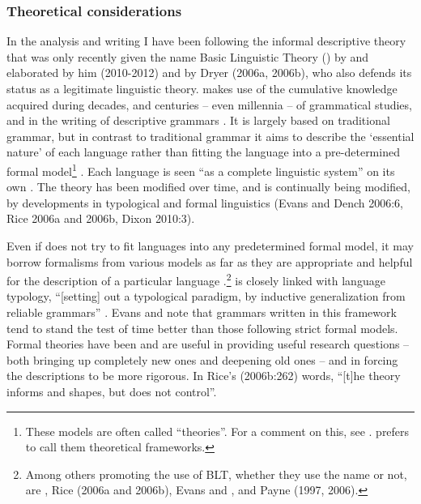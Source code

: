 \subsubsection{Theoretical considerations}
\hypertarget{RefHeading18361935131865}{}In the analysis and writing I have been following the informal descriptive theory that was only recently given the name Basic Linguistic Theory () by \citet{Dixon1997} and elaborated by him (2010-2012) and by Dryer (2006a, 2006b), who also defends its status as a legitimate linguistic theory.  makes use of the cumulative knowledge acquired during decades, and centuries -- even millennia -- of grammatical studies, and in the writing of descriptive grammars \citep[3]{Dixon2010}. It is largely based on traditional grammar, but in contrast to traditional grammar it aims to describe the `essential nature' of each language rather than fitting the language into a pre-determined formal model\footnote{These models are often called ``theories''.  For a comment on this, see \citet[131]{Dixon1997}. \citet{Dryer2006a} prefers to call them theoretical frameworks.} \citep[211]{Dryer2006a}. Each language is seen ``as a complete linguistic system'' on its own \citep[4]{Dixon2010}. The theory has been modified over time, and is continually being modified, by developments in typological and formal linguistics (Evans and Dench 2006:6, Rice 2006a and 2006b, Dixon 2010:3).  

Even if  does not try to fit languages into any predetermined formal model, it may borrow formalisms from various models as far as they are appropriate and helpful for the description of a particular language \citep[128-135]{Dixon1997}.\footnote{Among others promoting the use of BLT, whether they use the name or not, are \citet[354]{Noonan2006}, Rice (2006a and 2006b), Evans and \citet{Dench2006}, and Payne (1997, 2006).}   is closely linked with language typology, ``[setting] out a typological paradigm, by inductive generalization from reliable grammars'' \citep[205]{Dixon2010}. Evans and \citet[6]{Dench2006} note that grammars written in this framework tend to stand the test of time better than those following strict formal models. Formal theories have been and are useful in providing useful research questions -- both bringing up completely new ones and deepening old ones -- and in forcing the descriptions to be more rigorous. In Rice's (2006b:262) words, ``[t]he theory informs and shapes, but does not control''. 

